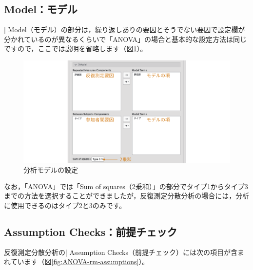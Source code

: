 \documentclass[
  12pt,
  a5jpaper,
  lualatex, ja=standard]{bxjsbook}
\begin{document}
\hypertarget{sub:ANOVA-rm-model}{%
\subsection{Model：モデル}\label{sub:ANOVA-rm-model}}

\colorbox{bar}{\textcolor{gmoji2}{| Model}}（モデル）の部分は，繰り返しありの要因とそうでない要因で設定欄が分かれているのが異なるくらいで「ANOVA」の場合と基本的な設定方法は同じですので，ここでは説明を省略します（図\ref{fig:ANOVA-rm-model}）。

\begin{figure}[!ht]

{\centering \includegraphics[width=1\linewidth]{images/ANOVA/rm-model} 

}

\caption{分析モデルの設定}\label{fig:ANOVA-rm-model}
\end{figure}

なお，「ANOVA」では「Sum of squares（2乗和）」の部分でタイプ1からタイプ3までの方法を選択することができましたが，反復測定分散分析の場合には，分析に使用できるのはタイプ2と3のみです。

\hypertarget{sub:ANOVA-rm-assumption}{%
\subsection{Assumption Checks：前提チェック}\label{sub:ANOVA-rm-assumption}}

反復測定分散分析の\colorbox{bar}{\textcolor{gmoji2}{| Assumption Checks}}（前提チェック）には次の項目が含まれています（図\ref{fig:ANOVA-rm-assumptions}）。
\end{document}

